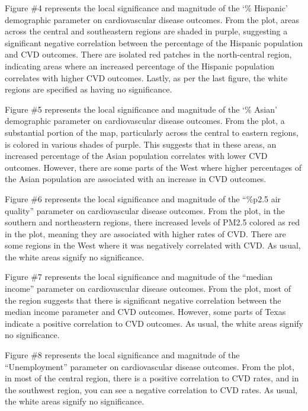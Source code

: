 \documentclass[
]{article}
\begin{document}
Figure \#4 represents the local significance and magnitude of the `\%
Hispanic' demographic parameter on cardiovascular disease outcomes. From
the plot, areas across the central and southeastern regions are shaded
in purple, suggesting a significant negative correlation between the
percentage of the Hispanic population and CVD outcomes. There are
isolated red patches in the north-central region, indicating areas where
an increased percentage of the Hispanic population correlates with
higher CVD outcomes. Lastly, as per the last figure, the white regions
are specified as having no significance.

Figure \#5 represents the local significance and magnitude of the `\%
Asian' demographic parameter on cardiovascular disease outcomes. From
the plot, a substantial portion of the map, particularly across the
central to eastern regions, is colored in various shades of purple. This
suggests that in these areas, an increased percentage of the Asian
population correlates with lower CVD outcomes. However, there are some
parts of the West where higher percentages of the Asian population are
associated with an increase in CVD outcomes.

Figure \#6 represents the local significance and magnitude of the
``\%p2.5 air quality'' parameter on cardiovascular disease outcomes.
From the plot, in the southern and northeastern regions, there increased
levels of PM2.5 colored as red in the plot, meaning they are associated
with higher rates of CVD. There are some regions in the West where it
was negatively correlated with CVD. As usual, the white areas signify no
significance.

Figure \#7 represents the local significance and magnitude of the
``median income'' parameter on cardiovascular disease outcomes. From the
plot, most of the region suggests that there is significant negative
correlation between the median income parameter and CVD outcomes.
However, some parts of Texas indicate a positive correlation to CVD
outcomes. As usual, the white areas signify no significance.

Figure \#8 represents the local significance and magnitude of the
``Unemployment'' parameter on cardiovascular disease outcomes. From the
plot, in most of the central region, there is a positive correlation to
CVD rates, and in the southwest region, you can see a negative
correlation to CVD rates. As usual, the white areas signify no
significance.
\end{document}
